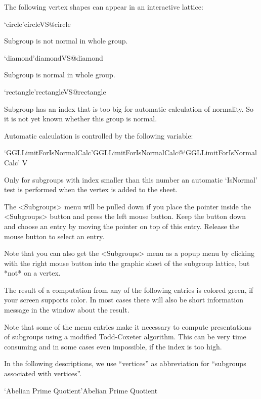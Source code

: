 The following vertex shapes can appear in an interactive lattice:

\>`circle'{circleVS}@{circle}

  Subgroup is not normal in whole group.

\>`diamond'{diamondVS}@{diamond}

  Subgroup is normal in whole group.

\>`rectangle'{rectangleVS}@{rectangle}

  Subgroup has an index that is too big for automatic calculation of
  normality. So it is not yet known whether this group is normal.

\bigskip

Automatic calculation is controlled by the following variable:

\>`GGLLimitForIsNormalCalc'{GGLLimitForIsNormalCalc}@{`GGLLimitForIsNormalCalc'} V

  Only for subgroups with index smaller than this number an automatic
  `IsNormal' test is performed when the vertex is added to the sheet.



The <Subgroups> menu will be pulled down  if you place the pointer inside
the <Subgroups> button and press the  left mouse button.  Keep the button
down and  choose an entry by  moving  the pointer on   top of this entry.
Release the mouse button to select an entry.

Note that you can also get the <Subgroups> menu as a popup menu by
clicking with the right mouse button into the graphic sheet of the subgroup
lattice, but *not* on a vertex.

The result of  a computation  from any  of  the following entries  is
colored green, if  your screen supports color.   In most cases there will
also be short information message in the {\GAP} window about the result.

Note that  some of   the menu entries  make  it  necessary  to compute
presentations of subgroups   using a modified Todd-Coxeter  algorithm. 
This can be very time consuming and  in some cases even impossible, if
the index is too high.

In  the following descriptions, we  use ``vertices'' as abbreviation for
``subgroups associated with vertices''.

\>`Abelian Prime Quotient'{Abelian Prime Quotient}

